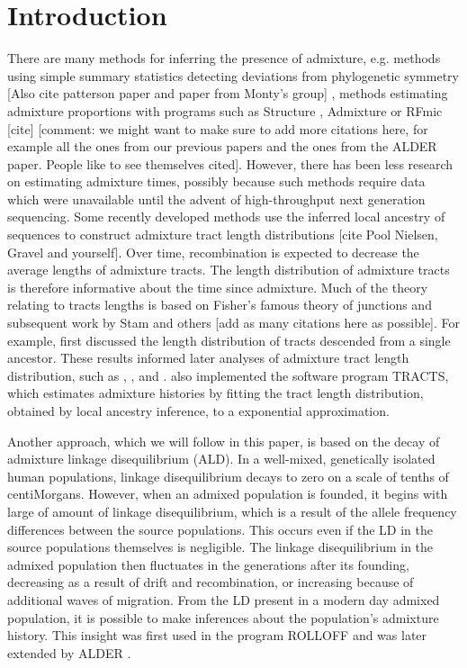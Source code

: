 \section*{Introduction}
There are many methods for inferring the presence of admixture, e.g. methods using simple summary statistics detecting deviations from phylogenetic symmetry \cite{reich2009reconstructing} [Also cite patterson paper and paper from Monty's group] , methods estimating admixture proportions with programs such as Structure \cite{pritchard2000inference},  Admixture \cite{alexander2009fast} or RFmic [cite] [comment: we might want to make sure to add more citations here, for example all the ones from our previous papers and the ones from the ALDER paper.  People like to see themselves cited]. However, there has been less research on estimating admixture times, possibly because such methods require data which were unavailable until the advent of high-throughput next generation sequencing. Some recently developed methods use the inferred local ancestry of sequences to construct admixture tract length distributions [cite Pool Nielsen, Gravel and yourself]. Over time, recombination is expected to decrease the average lengths of admixture tracts. The length distribution of admixture tracts is therefore informative about the time since admixture.  Much of the theory relating to tracts lengths is based on Fisher's famous theory of junctions \cite{fisher1949theory} and subsequent work by Stam \cite{stam1980distribution} and others [add as many citations here as possible]. For example, \cite{baird2003distribution} first discussed the length distribution of tracts descended from a single ancestor. These results informed later analyses of admixture tract length distribution, such as \cite{pool2009inference}, \cite{gravel2012population}, and \cite{liang2014lengths}. \cite{gravel2012population} also implemented the software program TRACTS, which estimates admixture histories by fitting the tract length distribution, obtained by local ancestry inference, to a exponential approximation.

Another approach, which we will follow in this paper, is based on the decay of admixture linkage disequilibrium (ALD). In a well-mixed, genetically isolated human populations, linkage disequilibrium decays to zero on a scale of tenths of centiMorgans. However, when an admixed population is founded, it begins with large of amount of linkage disequilibrium, which is a result of the allele frequency differences between the source populations. This occurs even if the LD in the source populations themselves is negligible. The linkage disequilibrium in the admixed population then fluctuates in the generations after its founding, decreasing as a result of drift and recombination, or increasing because of additional waves of migration. From the LD present in a modern day admixed population, it is possible to make inferences about the population's admixture history. This insight was first used in the program ROLLOFF \cite{moorjani2011history} and was later extended by ALDER \cite{loh2013inferring}.

